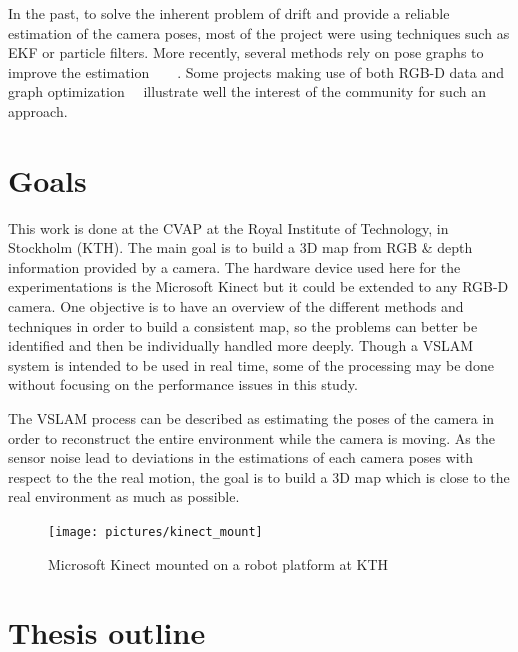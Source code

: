 In the past, to solve the inherent problem of drift and provide a reliable estimation of the camera poses, most of the project were using techniques such as \gls{EKF} or particle filters. More recently, several methods rely on pose graphs to improve the estimation~\cite{Thrun05_GraphSLAM}~\cite{grisetti07rss}~\cite{g2o_2011}~\cite{hogman_2010}. Some projects making use of both RGB-D data and graph optimization~\cite{Henry_RGBD_2010}~\cite{engelhard11euron-workshop} illustrate well the interest of the community for such an approach.

\clearpage
\section{Goals}

This work is done at the \gls{CVAP} at the Royal Institute of Technology, in Stockholm (KTH). The main goal is to build a 3D map from RGB \& depth information provided by a camera. The hardware device used here for the experimentations is the Microsoft Kinect but it could be extended to any RGB-D camera. One objective is to have an overview of the different methods and techniques in order to build a consistent map, so the problems can better be identified and then be individually handled more deeply. Though a \gls{VSLAM} system is intended to be used in real time, some of the processing may be done without focusing on the performance issues in this study. 

The \gls{VSLAM} process can be described as estimating the poses of the camera in order to reconstruct the entire environment while the camera is moving. As the sensor noise lead to deviations in the estimations of each camera poses with respect to the the real motion, the goal is to build a 3D map which is close to the real environment as much as possible.

\begin{figure}[H]
\centering
\texttt{[image: pictures/kinect\_mount]}
\caption{Microsoft Kinect mounted on a robot platform at KTH}
\end{figure}

\clearpage
\section{Thesis outline}

